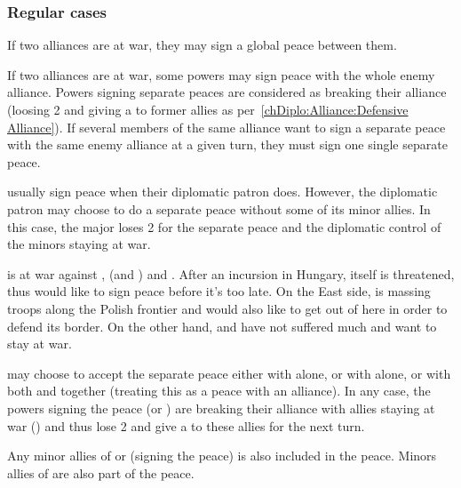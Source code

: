 \subsubsection{Regular cases}
 If two alliances are at war, they may sign a global
peace between them.

 If two alliances are at war, some
powers may sign peace with the whole enemy alliance.
\bparag Powers signing separate peaces are considered as breaking their
alliance (loosing 2 \STAB and giving a \CB to former allies as
per~\ref{chDiplo:Alliance:Defensive Alliance}).
\bparag If several members of the same alliance want to sign a separate peace
with the same enemy alliance at a given turn, they must sign one single
separate peace.

 usually sign peace when their diplomatic patron does.
\bparag However, the diplomatic patron may choose to do a separate peace
without some of its minor allies. In this case, the major loses 2 \STAB for
the separate peace and the diplomatic control of the minors staying at war.

\begin{exemple}
  \TUR is at war against \VEN, \HIS (and \AUS) and \POL. After an incursion in
  Hungary, \provinceVeneto itself is threatened, thus \VEN would like to sign
  peace before it's too late. On the East side, \RUS is massing troops along
  the Polish frontier and \POL would also like to get out of here in order to
  defend its border. On the other hand, \HIS and \AUS have not suffered much
  and want to stay at war.

  \TUR may choose to accept the separate peace either with \VEN alone, or with
  \POL alone, or with both \VEN and \POL together (treating this as a peace
  with an alliance). In any case, the powers signing the peace (\VEN or \POL)
  are breaking their alliance with allies staying at war (\HIS) and thus lose
  2 \STAB and give a \CB to these allies for the next turn.

  Any minor allies of \VEN or \POL (signing the peace) is also included in the
  peace. Minors allies of \TUR are also part of the peace.
\end{exemple}

